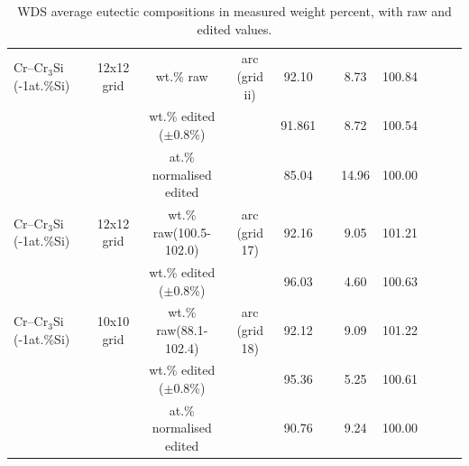 \begin{landscape}
\begin{table}[htdp]
\begin{center}
\begin{tabular}{lcccccccccc}
Cr--Cr$_3$Si (-1at.\%Si) &12x12 grid &wt.\% raw			&arc (grid ii)&92.10	&		&   8.73    	&100.84\\
			   &				   		&wt.\% edited ($\pm$0.8\%) & 			&91.861	&		&   8.72    	&100.54\\
			   &				   		&at.\% normalised	 edited	& 			&85.04		&		&   14.96  	&100.00\\

Cr--Cr$_3$Si (-1at.\%Si) &12x12 grid &wt.\% raw(100.5-102.0)			&arc (grid 17)&92.16	&		&   9.05    	&101.21\\
			   &				   		&wt.\% edited ($\pm$0.8\%) & 			&96.03	&		&   4.60    	&100.63\\

Cr--Cr$_3$Si (-1at.\%Si) &10x10 grid &wt.\% raw(88.1-102.4)			&arc (grid 18)	&92.12	&		&   9.09    	&101.22\\
			   &				   		&wt.\% edited ($\pm$0.8\%) & 				&95.36	&		&   5.25    	&100.61\\
			   &				   		&at.\% normalised	 edited	& 			&90.76	&		&   9.24  		&100.00\\


\hline
\end{tabular}
\end{center}
\caption{WDS average eutectic compositions in measured weight percent, with raw and edited values.}
\label{tab:crat}
\end{table}
\end{landscape}
%

